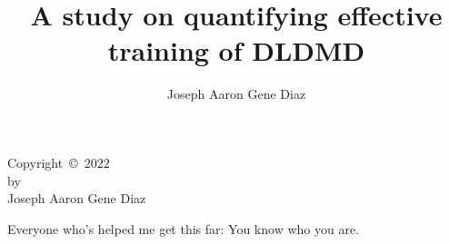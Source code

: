 \documentclass{sdsu-thesis}
\author{Joseph Aaron Gene Diaz}
\title{A study on quantifying effective training of DLDMD}
\theoremstyle{dtm}
\begin{document}
\maketitle

\makesignature

\begin{copyrightpage}
  Copyright~\copyright~2022 \\
  by \\
  Joseph Aaron Gene Diaz
\end{copyrightpage}


% 
\begin{dedication}
  \vspace{3in}
  \centering
  Everyone who's helped me get this far: You know who you are.
\end{dedication}


% 


\begin{abstract}
  
\end{abstract}


\tableofcontents
\end{document}

